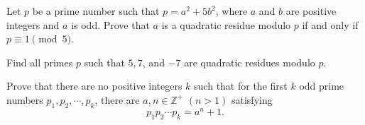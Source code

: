 \documentclass{subfile}
\begin{document}
	\begin{problem}
		Let $p$ be a prime number such that $p=a^2+5b^2$, where $a$ and $b$ are positive integers and $a$ is odd. Prove that $a$ is a quadratic residue modulo $p$ if and only if $p \equiv 1 \pmod 5$.
	\end{problem}
	
	
	\begin{problem} %
		Find all primes $p$ such that $5,7$, and $-7$ are quadratic residues modulo $p$. 
	\end{problem}
	
	
	
	\begin{problem}
		Prove that there are no positive integers $k$ such that for the first $k$ odd prime numbers $p_1,p_2,\cdots,p_k$, there are $a,n\in\mathbb{Z}^+$ $(n>1)$ satisfying \[ p_1p_2\cdots p_k=a^n+1.\] %
	\end{problem}
	
\end{document}
